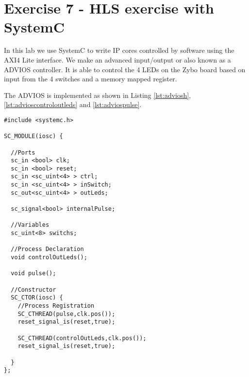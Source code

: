 \section{Exercise 7 - HLS exercise with SystemC}
In this lab we use SystemC to write IP cores controlled by software using the AXI4 Lite interface. We make an advanced input/output or also known as a ADVIOS controller. It is able to control the 4 LEDs on the Zybo board based on input from the 4 switches and a memory mapped register.

The ADVIOS is implemented as shown in Listing \ref{lst:adviosh}, \ref{lst:advioscontroloutleds} and \ref{lst:adviospulse}.

\begin{lstlisting}[style=customc++, caption=ADVIOS SystemC h-file code,
label={lst:adviosh}]
#include <systemc.h>

SC_MODULE(iosc) {

  //Ports
  sc_in <bool> clk;
  sc_in <bool> reset;
  sc_in <sc_uint<4> > ctrl;
  sc_in <sc_uint<4> > inSwitch;
  sc_out<sc_uint<4> > outLeds;
	
  sc_signal<bool> internalPulse;
	
  //Variables
  sc_uint<8> switchs;
	
  //Process Declaration
  void controlOutLeds();
	
  void pulse();
	
  //Constructor
  SC_CTOR(iosc) {
    //Process Registration
    SC_CTHREAD(pulse,clk.pos());
    reset_signal_is(reset,true);
		
    SC_CTHREAD(controlOutLeds,clk.pos());
    reset_signal_is(reset,true);
	
  }
};
\end{lstlisting}

